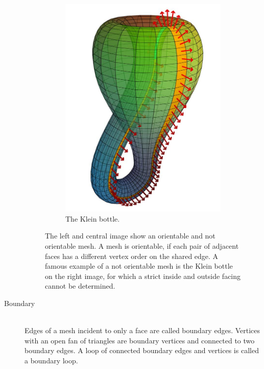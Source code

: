 \begin{description}
\begin{figure}[H]
\begin{subfigure}[b]{0.3\textwidth}
			\includegraphics[width=\textwidth]{images/klein_bottle}
			\caption{The Klein bottle.}
			\label{fig:klein_bottle}
		\end{subfigure}
		\caption[Orientable meshes]{
			The left and central image show an orientable and not orientable mesh.
			A mesh is orientable, if each pair of adjacent faces has a different vertex order on the shared edge.
			A famous example of a not orientable mesh is the Klein bottle on the right image, for which a strict inside and outside facing cannot be determined.
		}
		\label{fig:orientable_mesh}
	\end{figure}


	\item[Boundary] \hfill \\
	Edges of a mesh incident to only a face are called boundary edges.
	Vertices with an open fan of triangles are boundary vertices and connected to two boundary edges.
	A loop of connected boundary edges and vertices is called a boundary loop.



\end{description}
